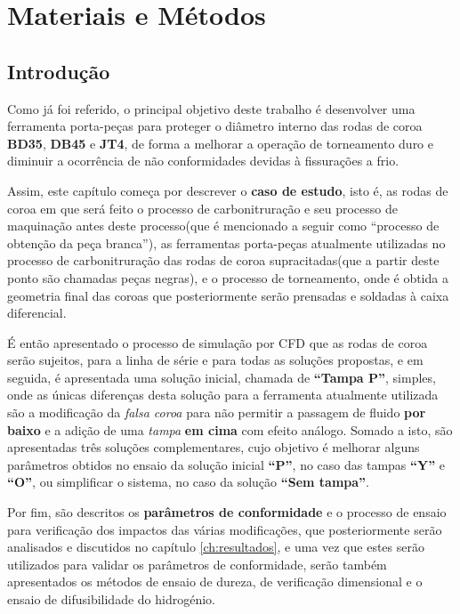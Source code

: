 \chapter{Materiais e Métodos} \label{ch:materiais}
\setlength{\headheight}{13.6pt}
\section{Introdução} \label{sec:materiais_intro}

Como já foi referido, o principal objetivo deste trabalho é desenvolver uma ferramenta porta-peças para proteger o diâmetro interno das rodas de coroa \textbf{BD35}, \textbf{DB45} e \textbf{JT4}, de forma a melhorar a operação de torneamento duro e diminuir a ocorrência de não conformidades devidas à fissurações a frio. 
\vspace{5mm}

\par
Assim, este capítulo começa por descrever o \textbf{caso de estudo}, isto é, as rodas de coroa em que será feito o processo de carbonitruração e seu processo de maquinação antes deste processo(que é mencionado a seguir como “processo de obtenção da peça branca”), as ferramentas porta-peças atualmente utilizadas no processo de carbonitruração das rodas de coroa supracitadas(que a partir deste ponto são chamadas peças negras), e o processo de torneamento, onde é obtida a geometria final das coroas que posteriormente serão prensadas e soldadas à caixa diferencial.
\vspace{5mm}

\par
É então apresentado o processo de simulação por CFD que as rodas de coroa serão sujeitos, para a linha de série e para todas as soluções propostas, e em seguida, é apresentada uma solução inicial, chamada de \textbf{“Tampa P”}, simples, onde as únicas diferenças desta solução para a ferramenta atualmente utilizada são a modificação da \textit{falsa coroa} para não permitir a passagem de fluido \textbf{por baixo} e a adição de uma \textit{tampa} \textbf{em cima} com efeito análogo. Somado a isto, são apresentadas três soluções complementares, cujo objetivo é melhorar alguns parâmetros obtidos no ensaio da solução inicial \textbf{“P”}, no caso das tampas \textbf{“Y”} e \textbf{“O”}, ou simplificar o sistema, no caso da solução \textbf{“Sem tampa”}.
\vspace{5mm}

\par
Por fim, são descritos os \textbf{parâmetros de conformidade} e o processo de ensaio para verificação dos impactos das várias modificações, que posteriormente serão analisados e discutidos no capítulo \ref{ch:resultados}, e uma vez que estes serão utilizados para validar os parâmetros de conformidade, serão também apresentados os métodos de ensaio de dureza, de verificação dimensional e o ensaio de difusibilidade do hidrogénio.
\vspace{5mm}
